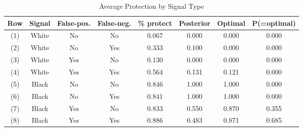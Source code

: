 \begin{table}[H]\centering \footnotesize \caption{Average Protection by Signal Type} \begin{tabular}{cccccccc} \hline \hline
\textbf{Row}&\textbf{Signal}&\textbf{False-pos.}&\textbf{False-neg.}&\textbf{\% protect}& \textbf{Posterior} & \textbf{Optimal} & \textbf{P(=optimal)} \\ \hline
(1)&White&No&No&0.067&0.000&0.000&0.000\\
(2)&White&No&Yes&0.333&0.100&0.000&0.000\\
(3)&White&Yes&No&0.130&0.000&0.000&0.000\\
(4)&White&Yes&Yes&0.564&0.131&0.121&0.000\\
(5)&Black&No&No&0.846&1.000&1.000&0.000\\
(6)&Black&No&Yes&0.841&1.000&1.000&0.000\\
(7)&Black&Yes&No&0.833&0.550&0.870&0.355\\
(8)&Black&Yes&Yes&0.886&0.483&0.871&0.685\\
\hline \end{tabular} \end{table}
